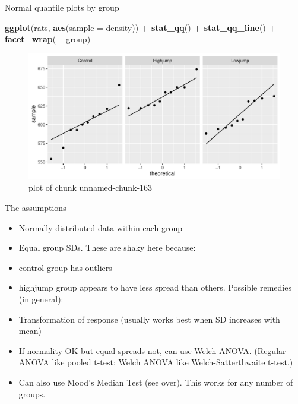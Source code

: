 \documentclass[ignorenonframetext,]{beamer}
\newenvironment{Shaded}{\begin{snugshade}}{\end{snugshade}}
\newcommand{\DataTypeTok}[1]{\textcolor[rgb]{0.13,0.29,0.53}{#1}}
\newcommand{\KeywordTok}[1]{\textcolor[rgb]{0.13,0.29,0.53}{\textbf{#1}}}
\newcommand{\NormalTok}[1]{#1}
\newcommand{\OperatorTok}[1]{\textcolor[rgb]{0.81,0.36,0.00}{\textbf{#1}}}
\newcommand{\StringTok}[1]{\textcolor[rgb]{0.31,0.60,0.02}{#1}}
\providecommand{\tightlist}{%
  \setlength{\itemsep}{0pt}\setlength{\parskip}{0pt}}
\begin{document}
\begin{frame}[fragile]{Normal quantile plots by group}
\protect\hypertarget{normal-quantile-plots-by-group}{}

\begin{Shaded}
\begin{Highlighting}[]
\KeywordTok{ggplot}\NormalTok{(rats, }\KeywordTok{aes}\NormalTok{(}\DataTypeTok{sample =}\NormalTok{ density)) }\OperatorTok{+}\StringTok{ }\KeywordTok{stat_qq}\NormalTok{() }\OperatorTok{+}\StringTok{ }
\StringTok{  }\KeywordTok{stat_qq_line}\NormalTok{() }\OperatorTok{+}\StringTok{ }\KeywordTok{facet_wrap}\NormalTok{( }\OperatorTok{~}\StringTok{ }\NormalTok{group)}
\end{Highlighting}
\end{Shaded}

\begin{figure}
\centering
\includegraphics{figure/unnamed-chunk-163-1.pdf}
\caption{plot of chunk unnamed-chunk-163}
\end{figure}

\end{frame}

\begin{frame}{The assumptions}
\protect\hypertarget{the-assumptions}{}

\begin{itemize}
\tightlist
\item
  Normally-distributed data within each group
\item
  Equal group SDs. These are shaky here because:
\item
  control group has outliers
\item
  highjump group appears to have less spread than others. Possible
  remedies (in general):
\item
  Transformation of response (usually works best when SD increases with
  mean)
\item
  If normality OK but equal spreads not, can use Welch ANOVA. (Regular
  ANOVA like pooled t-test; Welch ANOVA like Welch-Satterthwaite
  t-test.)
\item
  Can also use Mood's Median Test (see over). This works for any number
  of groups.
\end{itemize}

\end{frame}
\end{document}
